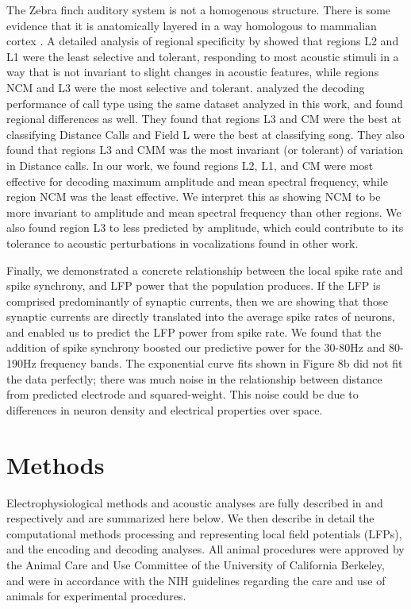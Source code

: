 The Zebra finch auditory system is not a homogenous structure. There is some evidence that it is anatomically layered in a way homologous to mammalian cortex \cite{Wang2010}. A detailed analysis of regional specificity by \cite{Meliza2012} showed that regions L2 and L1 were the least selective and tolerant, responding to most acoustic stimuli in a way that is not invariant to slight changes in acoustic features, while regions NCM and L3 were the most selective and tolerant. \cite{Elie2015a} analyzed the decoding performance of call type using the same dataset analyzed in this work, and found regional differences as well. They found that regions L3 and CM were the best at classifying Distance Calls and Field L were the best at classifying song. They also found that regions L3 and CMM was the most invariant (or tolerant) of variation in Distance calls. In our work, we found regions L2, L1, and CM were most effective for decoding maximum amplitude and mean spectral frequency, while region NCM was the least effective. We interpret this as showing NCM to be more invariant to amplitude and mean spectral frequency than other regions. We also found region L3 to less predicted by amplitude, which could contribute to its tolerance to acoustic perturbations in vocalizations found in other work.

    Finally, we demonstrated a concrete relationship between the local spike rate and spike synchrony, and LFP power that the population produces. If the LFP is comprised predominantly of synaptic currents, then we are showing that those synaptic currents are directly translated into the average spike rates of neurons, and enabled us to predict the LFP power from spike rate. We found that the addition of spike synchrony boosted our predictive power for the 30-80Hz and 80-190Hz frequency bands. The exponential curve fits shown in Figure 8b did not fit the data perfectly; there was much noise in the relationship between distance from predicted electrode and squared-weight. This noise could be due to differences in neuron density and electrical properties over space.


\section{Methods}

Electrophysiological methods and acoustic analyses are fully described in \cite{Elie2015a} and \cite{Elie2015b} respectively and are summarized here below. We then describe in detail the computational methods processing and representing local field potentials (LFPs), and the encoding and decoding analyses. All animal procedures were approved by the Animal Care and Use Committee of the University of California Berkeley, and were in accordance with the NIH guidelines regarding the care and use of animals for experimental procedures.

